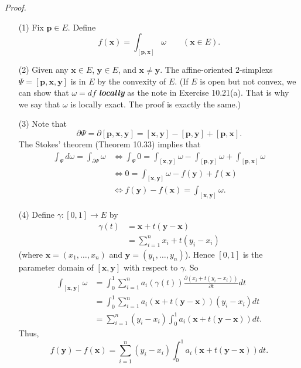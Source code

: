 \documentclass{article}
\begin{document}
\emph{Proof.}
\begin{enumerate}
\item[(1)]
  Fix $\mathbf{p} \in E$.
  Define
  \[
    f(\mathbf{x}) = \int_{[\mathbf{p},\mathbf{x}]} \omega
    \qquad
    (\mathbf{x} \in E).
  \]

\item[(2)]
  Given any $\mathbf{x} \in E$, $\mathbf{y} \in E$, and $\mathbf{x} \neq \mathbf{y}$.
  The affine-oriented $2$-simplexs $\Psi = [\mathbf{p},\mathbf{x},\mathbf{y}]$ is in $E$
  by the convexity of $E$.
  (If $E$ is open but not convex,
  we can show that $\omega = df$ \textbf{\emph{locally}} as the note in Exercise 10.21(a).
  That is why we say that $\omega$ is locally exact.
  The proof is exactly the same.)

\item[(3)]
  Note that
  \[
    \partial \Psi
    = \partial [\mathbf{p},\mathbf{x},\mathbf{y}]
    = [\mathbf{x},\mathbf{y}] - [\mathbf{p},\mathbf{y}] + [\mathbf{p},\mathbf{x}].
  \]
  The Stokes' theorem (Theorem 10.33) implies that
  \begin{align*}
    \int_{\Psi} d\omega
    = \int_{\partial \Psi} \omega
    &\Longleftrightarrow
    \int_{\Psi} 0
    = \int_{[\mathbf{x},\mathbf{y}]} \omega
      - \int_{[\mathbf{p},\mathbf{y}]} \omega
      + \int_{[\mathbf{p},\mathbf{x}]} \omega \\
    &\Longleftrightarrow
    0 = \int_{[\mathbf{x},\mathbf{y}]} \omega - f(\mathbf{y}) + f(\mathbf{x}) \\
    &\Longleftrightarrow
    f(\mathbf{y}) - f(\mathbf{x}) = \int_{[\mathbf{x},\mathbf{y}]} \omega.
  \end{align*}

\item[(4)]
  Define $\gamma: [0,1] \to E$ by
  \begin{align*}
    \gamma(t)
    &= \mathbf{x} + t(\mathbf{y}-\mathbf{x}) \\
    &= \sum_{i=1}^{n} x_i + t(y_i - x_i)
  \end{align*}
  (where $\mathbf{x} = (x_1, \ldots, x_n)$ and $\mathbf{y} = (y_1, \ldots, y_n)$).
  Hence $[0,1]$ is the parameter domain of $[\mathbf{x},\mathbf{y}]$ with respect to $\gamma$.
  So
  \begin{align*}
    \int_{[\mathbf{x},\mathbf{y}]} \omega
    &= \int_{0}^{1} \sum_{i=1}^{n} a_i(\gamma(t))
      \frac{\partial (x_i + t(y_i - x_i))}{\partial t} dt \\
    &= \int_{0}^{1} \sum_{i=1}^{n} a_i(\mathbf{x} + t(\mathbf{y}-\mathbf{x}))(y_i - x_i) dt \\
    &= \sum_{i=1}^{n} (y_i - x_i) \int_{0}^{1} a_i(\mathbf{x} + t(\mathbf{y}-\mathbf{x})) dt.
  \end{align*}
  Thus,
  \[
    f(\mathbf{y}) - f(\mathbf{x})
    = \sum_{i=1}^{n} (y_i - x_i) \int_{0}^{1} a_i(\mathbf{x} + t(\mathbf{y}-\mathbf{x})) dt.
  \]


\end{enumerate}
\end{document}
